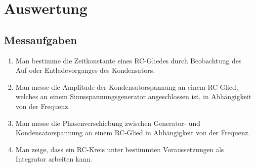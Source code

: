 \documentclass{scrartcl}
\begin{document}
	\section{Auswertung}

		\subsection{Messaufgaben}

			\begin{enumerate}
				\item Man bestimme die Zeitkonstante eines RC-Gliedes durch Beobachtung des Auf oder Entladevorganges des Kondensators.
				\item Man messe die Amplitude der Kondensatorspannung an einem RC-Glied, welches an einem Sinusspannungsgenerator angeschlossen ist, in Abhängigkeit von der Frequenz.
				\item Man messe die Phasenverschiebung zwischen Generator- und Kondensatorspannung an einem RC-Glied in Abhängigkeit von der Frequenz.
				\item Man zeige, dass ein RC-Kreis unter bestimmten Voraussetzungen als Integrator arbeiten kann.
			\end{enumerate}
\end{document}
